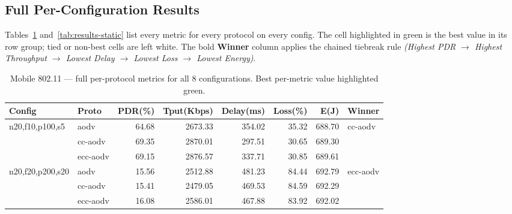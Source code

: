 \documentclass[11pt,a4paper]{article}
\begin{document}
\subsection{Full Per-Configuration Results}

Tables~\ref{tab:results-mobile} and~\ref{tab:results-static} list every metric
for every protocol on every config. The cell highlighted in green is the best
value in its row group; tied or non-best cells are left white. The bold
\textbf{Winner} column applies the chained tiebreak rule
\emph{(Highest PDR $\to$ Highest Throughput $\to$ Lowest Delay $\to$ Lowest
Loss $\to$ Lowest Energy)}.

\begin{table}[h]
\centering
\caption{Mobile 802.11 — full per-protocol metrics for all $8$ configurations.
Best per-metric value highlighted green.}
\label{tab:results-mobile}
\scriptsize
\setlength{\tabcolsep}{4pt}
\begin{tabular}{l l r r r r r l}
\toprule
\textbf{Config} & \textbf{Proto} & \textbf{PDR(\%)} & \textbf{Tput(Kbps)} & \textbf{Delay(ms)} & \textbf{Loss(\%)} & \textbf{E(J)} & \textbf{Winner} \\
\midrule
\multirow{3}{*}{n20,f10,p100,s5}
 & aodv     & 64.68                       & 2673.33                       & 354.02                       & 35.32                       & \cellcolor{lightgreen}688.70 & \multirow{3}{*}{cc-aodv} \\
 & cc-aodv  & \cellcolor{lightgreen}69.35 & 2870.01                       & \cellcolor{lightgreen}297.51 & \cellcolor{lightgreen}30.65 & 689.30                       & \\
 & ecc-aodv & 69.15                       & \cellcolor{lightgreen}2876.57 & 337.71                       & 30.85                       & 689.61                       & \\
\midrule
\multirow{3}{*}{n20,f20,p200,s20}
 & aodv     & 15.56                       & 2512.88                       & 481.23                       & 84.44                       & 692.79                       & \multirow{3}{*}{ecc-aodv} \\
 & cc-aodv  & 15.41                       & 2479.05                       & 469.53                       & 84.59                       & 692.29                       & \\
 & ecc-aodv & \cellcolor{lightgreen}16.08 & \cellcolor{lightgreen}2586.01 & \cellcolor{lightgreen}467.88 & \cellcolor{lightgreen}83.92 & \cellcolor{lightgreen}692.02 & \\

\end{tabular}
\end{table}
\end{document}
